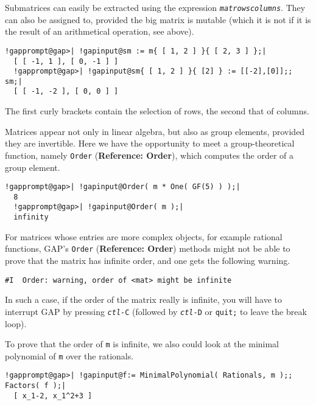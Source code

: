 \documentclass[a4paper,11pt]{report}
\begin{document}
{{ Submatrices can easily be extracted using the expression \texttt{\mbox{\texttt{\mdseries\slshape mat}}\texttt{}\mbox{\texttt{\mdseries\slshape rows}}\texttt{}\texttt{}\mbox{\texttt{\mdseries\slshape columns}}\texttt{}}. They can also be assigned to, provided the big matrix is mutable (which it
is not if it is the result of an arithmetical operation, see above). 

 
\begin{Verbatim}[commandchars=!@|,fontsize=\small,frame=single,label=Example]
  !gapprompt@gap>| !gapinput@sm := m{ [ 1, 2 ] }{ [ 2, 3 ] };|
  [ [ -1, 1 ], [ 0, -1 ] ]
  !gapprompt@gap>| !gapinput@sm{ [ 1, 2 ] }{ [2] } := [[-2],[0]];;  sm;|
  [ [ -1, -2 ], [ 0, 0 ] ]
\end{Verbatim}
 

 The first curly brackets contain the selection of rows, the second that of
columns. 

 Matrices appear not only in linear algebra, but also as group elements,
provided they are invertible. Here we have the opportunity to meet a
group-theoretical function, namely \texttt{Order} (\textbf{Reference: Order}), which computes the order of a group element. 

 
\begin{Verbatim}[commandchars=!@|,fontsize=\small,frame=single,label=Example]
  !gapprompt@gap>| !gapinput@Order( m * One( GF(5) ) );|
  8
  !gapprompt@gap>| !gapinput@Order( m );|
  infinity
\end{Verbatim}
 

 For matrices whose entries are more complex objects, for example rational
functions, \textsf{GAP}'s \texttt{Order} (\textbf{Reference: Order}) methods might not be able to prove that the matrix has infinite order, and one
gets the following warning. 
\begin{Verbatim}[commandchars=!@|,fontsize=\small,frame=single,label=Example]
  #I  Order: warning, order of <mat> might be infinite
\end{Verbatim}
 In such a case, if the order of the matrix really is infinite, you will have
to interrupt \textsf{GAP} by pressing \texttt{\mbox{\texttt{\mdseries\slshape ctl}}-C} (followed by \texttt{\mbox{\texttt{\mdseries\slshape ctl}}-D} or \texttt{quit;} to leave the break loop). 

 To prove that the order of \texttt{m} is infinite, we also could look at the minimal polynomial of \texttt{m} over the rationals. 

 
\begin{Verbatim}[commandchars=!@|,fontsize=\small,frame=single,label=Example]
  !gapprompt@gap>| !gapinput@f:= MinimalPolynomial( Rationals, m );;  Factors( f );|
  [ x_1-2, x_1^2+3 ]
\end{Verbatim}
 

}}
\end{document}
